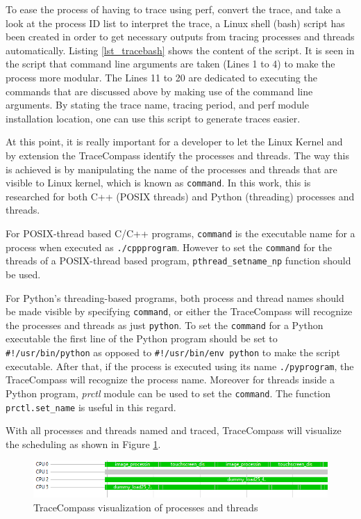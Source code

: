 \begin{itemize}
	To ease the process of having to trace using perf, convert the trace, and take a look at the process ID list to interpret the trace, a Linux shell (bash) script has been created in order to get necessary outputs from tracing processes and threads automatically. Listing \ref{lst_tracebash} shows the content of the script. It is seen in the script that command line arguments are taken (Lines 1 to 4) to make the process more modular. The Lines 11 to 20 are dedicated to executing the commands that are discussed above by making use of the command line arguments. By stating the trace name, tracing period, and perf module installation location, one can use this script to generate traces easier. %
	\newpage
	
	
	At this point, it is really important for a developer to let the Linux Kernel and by extension the TraceCompass identify the processes and threads. The way this is achieved is by manipulating the name of the processes and threads that are visible to Linux kernel, which is known as \texttt{command}. In this work, this is researched for both C++ (POSIX threads) and Python (threading) processes and threads.
	
	For POSIX-thread based C/C++ programs, \texttt{command} is the executable name for a process when executed as \texttt{./cppprogram}. However to set the \texttt{command} for the threads of a POSIX-thread based program, \texttt{pthread{\_}setname{\_}np} function should be used.
	
	For Python's threading-based programs, both process and thread names should be made visible by specifying \texttt{command}, or either the TraceCompass will recognize the processes and threads as just \texttt{python}. To set the \texttt{command} for a Python executable the first line of the Python program should be set to \texttt{\#!/usr/bin/python} as opposed to \texttt{\#!/usr/bin/env python} to make the script executable. After that, if the process is executed using its name \texttt{./pyprogram}, the TraceCompass will recognize the process name. Moreover for threads inside a Python program, \textit{prctl} module can be used to set the \texttt{command}. The function \texttt{prctl.set{\_}name} is useful in this regard.
	
	With all processes and threads named and traced, TraceCompass will visualize the scheduling as shown in Figure \ref{fig:tracecompasscommands}.
	
	\begin{figure}[!ht]
		\centering
		\captionsetup{justification=centering}
		\includegraphics[width=\textwidth]{content/images/tracecompasscommands.png}
		\caption{TraceCompass visualization of processes and threads}
		\label{fig:tracecompasscommands}
	\end{figure}

\end{itemize}

